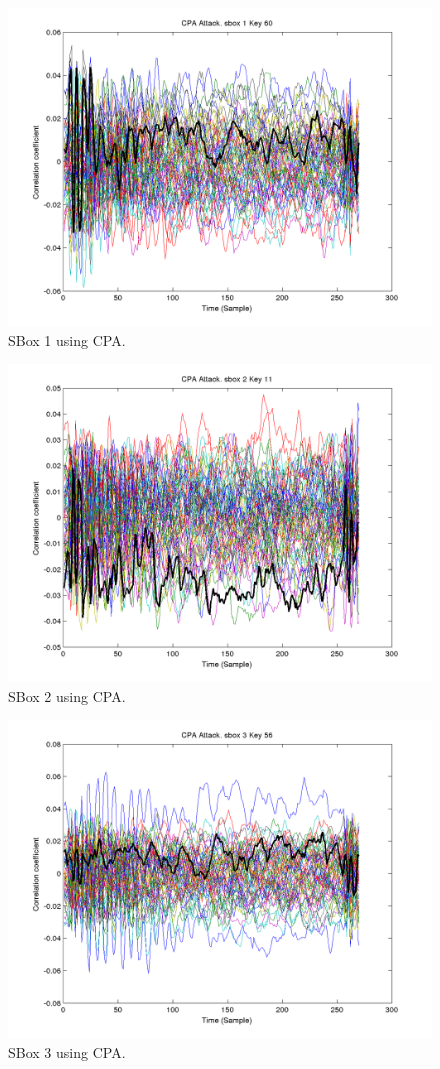   \begin{figure}[]
  \includegraphics[width=0.9\linewidth]{./cpa1}
  \caption{SBox 1 using CPA.}
  \label{fig:cpa1}
  \end{figure}

  \begin{figure}[]
  \includegraphics[width=0.9\linewidth]{./cpa2}
  \caption{SBox 2 using CPA.}
  \label{fig:cpa2}
  \end{figure}

  \begin{figure}[]
  \includegraphics[width=0.9\linewidth]{./cpa3}
  \caption{SBox 3 using CPA.}
  \label{fig:cpa3}
  \end{figure}


